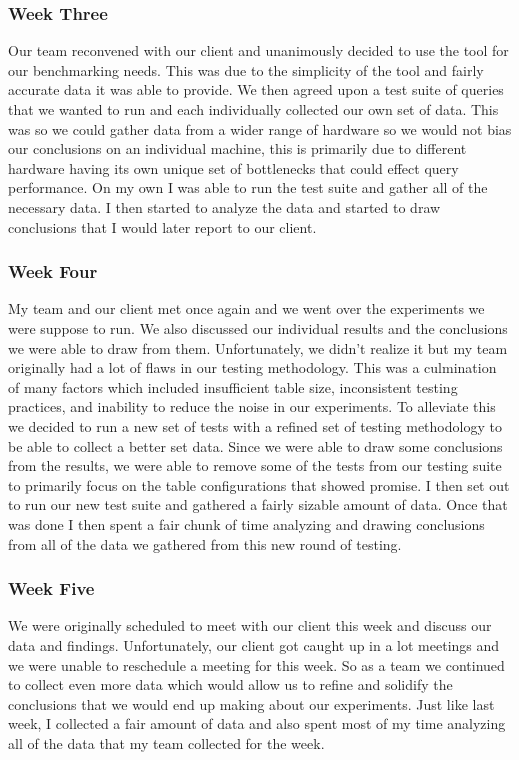 \documentclass[10pt]{article}
\begin{document}
\subsubsection{Week Three}
Our team reconvened with our client and unanimously decided to use the tool for our benchmarking needs. This was due to the simplicity of the tool and fairly accurate data it was able to provide. We then agreed upon a test suite of queries that we wanted to run and each individually collected our own set of data. This was so we could gather data from a wider range of hardware so we would not bias our conclusions on an individual machine, this is primarily due to different hardware having its own unique set of bottlenecks that could effect query performance. On my own I was able to run the test suite and gather all of the necessary data. I then started to analyze the data and started to draw conclusions that I would later report to our client.

\subsubsection{Week Four}
My team and our client met once again and we went over the experiments we were suppose to run. We also discussed our individual results and the conclusions we were able to draw from them. Unfortunately, we didn't realize it but my team originally had a lot of flaws in our testing methodology. This was a culmination of many factors which included insufficient table size, inconsistent testing practices, and inability to reduce the noise in our experiments. To alleviate this we decided to run a new set of tests with a refined set of testing methodology to be able to collect a better set data. Since we were able to draw some conclusions from the results, we were able to remove some of the tests from our testing suite to primarily focus on the table configurations that showed promise. I then set out to run our new test suite and gathered a fairly sizable amount of data. Once that was done I then spent a fair chunk of time analyzing and drawing conclusions from all of the data we gathered from this new round of testing.

\subsubsection{Week Five}
We were originally scheduled to meet with our client this week and discuss our data and findings. Unfortunately, our client got caught up in a lot meetings and we were unable to reschedule a meeting for this week. So as a team we continued to collect even more data which would allow us to refine and solidify the conclusions that we would end up making about our experiments. Just like last week, I collected a fair amount of data and also spent most of my time analyzing all of the data that my team collected for the week.
\end{document}
